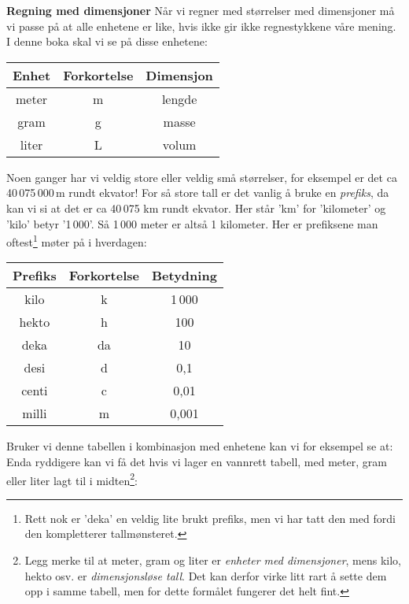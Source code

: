\textbf{Regning med dimensjoner}\os
Når vi regner med størrelser med dimensjoner må vi passe på at alle enhetene er like, hvis ikke gir ikke regnestykkene våre mening. I denne boka skal vi se på disse enhetene:
\tbs
\begin{center}
	\begin{tabular}{c|c|c}
		\textbf{Enhet} & \textbf{Forkortelse} &\textbf{Dimensjon}\\ \hline
		meter & m &lengde\\\hline
		gram & g &masse\\\hline
		liter & L & volum
	\end{tabular}
\end{center}\tbs
Noen ganger har vi veldig store eller veldig små størrelser, for eksempel er det ca 40\,075\,000\,m rundt ekvator! For så store tall er det vanlig å bruke en \textit{prefiks}, da kan vi si at det er ca 40\,075 km rundt ekvator. Her står 'km' for 'kilometer' og 'kilo' betyr '1\,000'. Så 1\,000 meter er altså 1 kilometer. Her er prefiksene man oftest\footnote{Rett nok er 'deka' en veldig lite brukt prefiks, men vi har tatt den med fordi den kompletterer tallmønsteret.} møter på i hverdagen:\tbs
\begin{center}
	\begin{tabular}{c|c|c}
		\textbf{Prefiks} & \textbf{Forkortelse}&\textbf{Betydning} \\ \hline
		kilo & k & 1\,000\\\hline
		hekto & h & 100\\\hline
		deka & da & 10\\\hline
		desi & d & 0,1\\\hline
		centi & c & 0,01\\\hline
		milli & m & 0,001\\\hline		
	\end{tabular}
\end{center}
\newpage
Bruker vi denne tabellen i kombinasjon med enhetene kan vi for eksempel se at:\vs
{}
Enda ryddigere kan vi få det hvis vi lager en vannrett tabell, med meter, gram eller liter lagt til i midten\footnote{Legg merke til at meter, gram og liter er \textsl{enheter med dimensjoner}, mens kilo, hekto osv. er \textsl{dimensjonsløse tall}. Det kan derfor virke litt rart å sette dem opp i samme tabell, men for dette formålet fungerer det helt fint.}: \regv

